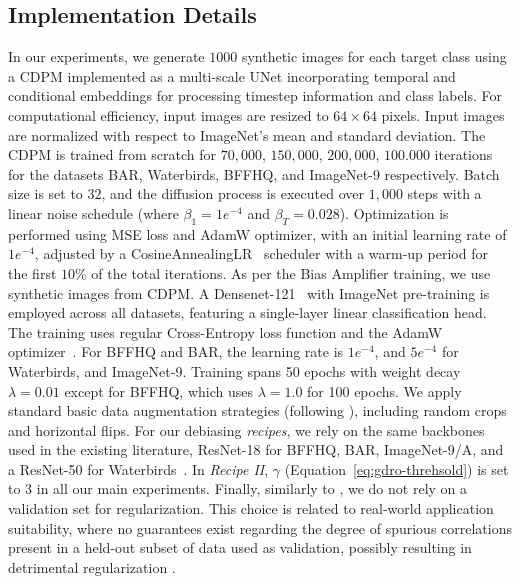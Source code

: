 \subsection{Implementation Details}
In our experiments, we generate $1000$ synthetic %
images for each target class using a CDPM implemented as a multi-scale UNet incorporating 
temporal and conditional embeddings for processing timestep information and class labels. For computational efficiency, input images are resized to $64\times64$ pixels. Input images are normalized with respect to ImageNet's mean and standard deviation. The CDPM is trained from scratch for $70,000$, $150,000$, $200,000$, $100.000$ iterations for the datasets BAR, Waterbirds, BFFHQ, and ImageNet-9 respectively. Batch size is set to $32$, and the diffusion process is executed over $1,000$ steps with a linear noise schedule (where $\beta_1 = 1e^{-4}$ and $\beta_T = 0.028$). Optimization is performed using MSE loss and AdamW optimizer, with an initial learning rate of $1e^{-4}$, adjusted by a CosineAnnealingLR~\cite{DBLP:conf/iclr/LoshchilovH17} scheduler with a warm-up period for the first $10\%$ of the total iterations.
As per the Bias Amplifier training, we use synthetic 
images from CDPM. A Densenet-121~\cite{huang2017densely} with ImageNet pre-training is employed across all datasets, featuring a single-layer linear classification head. The training uses regular Cross-Entropy loss function and the AdamW optimizer~\cite{loshchilov2018decoupled}. For BFFHQ and BAR, the learning rate is $1e^{-4}$, and $5e^{-4}$ for Waterbirds, and ImageNet-9. Training spans 50 epochs with weight decay $\lambda=0.01$ except for BFFHQ, which uses $\lambda = 1.0$ for 100 epochs. We apply standard basic data augmentation strategies (following \cite{kim2021biaswap, nam2020learning}), including random crops and horizontal flips. 
For our debiasing \textit{recipes}, we rely on the same backbones used in the existing literature, \ie ResNet-18 for BFFHQ, BAR, ImageNet-9/A, and a ResNet-50 for Waterbirds~\cite{nam2020learning, kim2021biaswap, kim2024discovering}. In \textit{Recipe II}, $\gamma$ (Equation~\ref{eq:gdro-threhsold}) is set to 3 in all our main experiments. Finally, similarly to \cite{li2022discover, nam2020learning, pastore2024lookingmodeldebiasinglens}, we do not rely on a validation set for regularization. This choice is related to real-world application suitability, where no guarantees exist regarding the degree of spurious correlations present in a held-out subset of data used as validation, possibly resulting in detrimental regularization \cite{zarlenga2024efficient}. 

